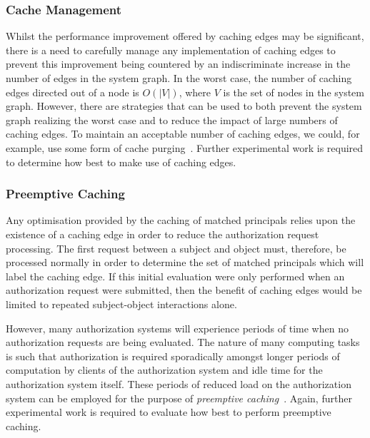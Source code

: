 \documentclass{article}
\begin{document}
\subsubsection{Cache Management}\label{sec:extended_typed_edges:caching_edges:management}
Whilst the performance improvement offered by caching edges may be significant, there is a need to carefully manage any implementation of caching edges to prevent this improvement being countered by an indiscriminate increase in the number of edges in the system graph.
In the worst case, the number of caching edges directed out of a node is $O(|V|)$, where $V$ is the set of nodes in the system graph.
However, there are strategies that can be used to both prevent the system graph realizing the worst case and to reduce the impact of large numbers of caching edges.
To maintain an acceptable number of caching edges, we could, for example, use some form of cache purging~\cite{CramptonS14_STM}.
Further experimental work is required to determine how best to make use of caching edges.

\subsubsection{Preemptive Caching}\label{sec:extended_typed_edges:caching_edges:preemptive}
Any optimisation provided by the caching of matched principals relies upon the existence of a caching edge in order to reduce the authorization request processing.
The first request between a subject and object must, therefore, be processed normally in order to determine the set of matched principals which will label the caching edge.
If this initial evaluation were only performed when an authorization request were submitted, then the benefit of caching edges would be limited to repeated subject-object interactions alone.

However, many authorization systems will experience periods of time when no authorization requests are being evaluated.
The nature of many computing tasks is such that authorization is required sporadically amongst longer periods of computation by clients of the authorization system and idle time for the authorization system itself.
These periods of reduced load on the authorization system can be employed for the purpose of \emph{preemptive caching}~\cite{CramptonS14_STM}.
Again, further experimental work is required to evaluate how best to perform preemptive caching.
\end{document}
